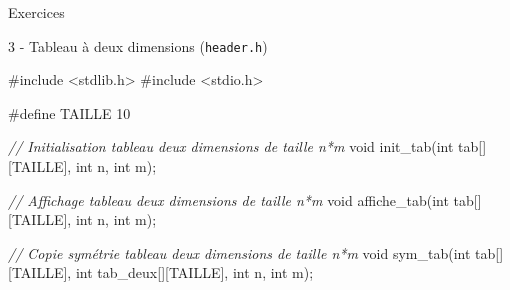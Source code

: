 \documentclass[
  10pt,
  french,
  ignorenonframetext,
  aspectratio=169,
]{beamer}
\newenvironment{Shaded}{}{}
\newcommand{\CommentTok}[1]{\textcolor[rgb]{0.38,0.63,0.69}{\textit{#1}}}
\newcommand{\DataTypeTok}[1]{\textcolor[rgb]{0.56,0.13,0.00}{#1}}
\newcommand{\ImportTok}[1]{#1}
\newcommand{\NormalTok}[1]{#1}
\newcommand{\OperatorTok}[1]{\textcolor[rgb]{0.40,0.40,0.40}{#1}}
\newcommand{\PreprocessorTok}[1]{\textcolor[rgb]{0.74,0.48,0.00}{#1}}
\begin{document}
\begin{frame}[fragile]{Exercices}
\protect\hypertarget{exercices-6}{}
\begin{block}{3 - Tableau à deux dimensions (\texttt{header.h})}
\protect\hypertarget{tableau-uxe0-deux-dimensions-header.h}{}
\begin{Shaded}
\begin{Highlighting}[]
\PreprocessorTok{\#include }\ImportTok{\textless{}stdlib.h\textgreater{}}
\PreprocessorTok{\#include }\ImportTok{\textless{}stdio.h\textgreater{}}

\PreprocessorTok{\#define TAILLE 10}

\CommentTok{// Initialisation tableau deux dimensions de taille n*m}
\DataTypeTok{void}\NormalTok{ init\_tab}\OperatorTok{(}\DataTypeTok{int}\NormalTok{ tab}\OperatorTok{[][}\NormalTok{TAILLE}\OperatorTok{],} \DataTypeTok{int}\NormalTok{ n}\OperatorTok{,} \DataTypeTok{int}\NormalTok{ m}\OperatorTok{);}

\CommentTok{// Affichage tableau deux dimensions de taille n*m}
\DataTypeTok{void}\NormalTok{ affiche\_tab}\OperatorTok{(}\DataTypeTok{int}\NormalTok{ tab}\OperatorTok{[][}\NormalTok{TAILLE}\OperatorTok{],} \DataTypeTok{int}\NormalTok{ n}\OperatorTok{,} \DataTypeTok{int}\NormalTok{ m}\OperatorTok{);}

\CommentTok{// Copie symétrie tableau deux dimensions de taille n*m}
\DataTypeTok{void}\NormalTok{ sym\_tab}\OperatorTok{(}\DataTypeTok{int}\NormalTok{ tab}\OperatorTok{[][}\NormalTok{TAILLE}\OperatorTok{],} \DataTypeTok{int}\NormalTok{ tab\_deux}\OperatorTok{[][}\NormalTok{TAILLE}\OperatorTok{],} \DataTypeTok{int}\NormalTok{ n}\OperatorTok{,} \DataTypeTok{int}\NormalTok{ m}\OperatorTok{);}
\end{Highlighting}
\end{Shaded}
\end{block}
\end{frame}
\end{document}
